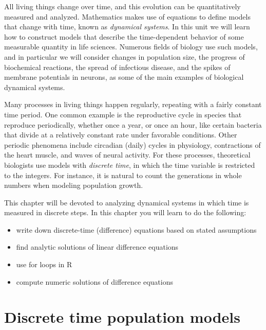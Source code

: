 \documentclass[
  letterpaper,
  DIV=11,
  numbers=noendperiod]{scrreprt}
\begin{document}
All living things change over time, and this evolution can be
quantitatively measured and analyzed. Mathematics makes use of equations
to define models that change with time, known as
 \emph{dynamical systems}. In this unit we
will learn how to construct models that describe the time-dependent
behavior of some measurable quantity in life sciences. Numerous fields
of biology use such models, and in particular we will consider changes
in population size, the progress of biochemical reactions, the spread of
infectious disease, and the spikes of membrane potentials in neurons, as
some of the main examples of biological dynamical systems.

Many processes in living things happen regularly, repeating with a
fairly constant time period. One common example is the reproductive
cycle in species that reproduce periodically, whether once a year, or
once an hour, like certain bacteria that divide at a relatively constant
rate under favorable conditions. Other periodic phenomena include
circadian (daily) cycles in physiology, contractions of the heart
muscle, and waves of neural activity. For these processes, theoretical
biologists use models with  \emph{discrete
time}, in which the time variable is restricted to the integers. For
instance, it is natural to count the generations in whole numbers when
modeling population growth.

This chapter will be devoted to analyzing dynamical systems in which
time is measured in discrete steps. In this chapter you will learn to do
the following:

\begin{itemize}
\item
  write down discrete-time (difference) equations based on stated
  assumptions
\item
  find analytic solutions of linear difference equations
\item
  use for loops in R
\item
  compute numeric solutions of difference equations
\end{itemize}

\hypertarget{discrete-time-population-models}{%
\section{Discrete time population
models}\label{discrete-time-population-models}}

\label{sec:model14}
\end{document}
